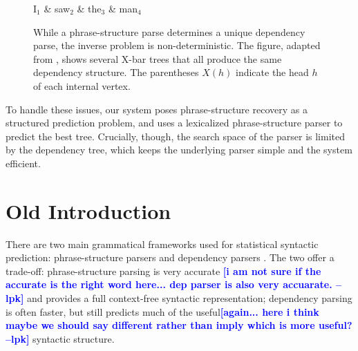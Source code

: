\documentclass[11pt,letterpaper]{article}
\newcommand{\lpkcomment}[1]{\textcolor{blue}{\bf \small [#1 --lpk]}}
\begin{document}
\begin{figure}
  \centering

  \vspace{-1cm}

  \begin{dependency}[theme=simple]
    \begin{deptext}[column sep=0.7cm]
      I$_1$ \& saw$_2$ \& the$_3$ \& man$_4$ \\
    \end{deptext}
  \end{dependency}

  \label{fig:inverse}
  \caption{{\footnotesize While a phrase-structure parse determines a unique dependency parse, the inverse problem is non-deterministic. The figure, adapted from \cite{collins1999statistical}, shows several X-bar trees that all produce the same dependency structure. The parentheses $X(h)$ indicate the head $h$ of each internal vertex. }}
\end{figure}


To handle these issues, our system poses phrase-structure recovery  as a structured
prediction problem, and uses a lexicalized phrase-structure
parser to predict the best tree. Crucially,
though, the search space of the parser is limited by the dependency tree, 
which keeps the underlying parser simple and the system efficient.










\section{Old Introduction}



There are two main grammatical
frameworks used for statistical syntactic prediction: phrase-structure parsers and
dependency parsers \cite{}. The two offer a
trade-off: phrase-structure parsing is very accurate \lpkcomment{i am not sure if the accurate is the right word here... dep parser is also very accuarate.} and provides a
full context-free syntactic representation; dependency parsing is
often faster, but still
predicts much of the useful\lpkcomment{again... here i think maybe we should say different rather than imply which is more useful?} syntactic structure.
\end{document}

